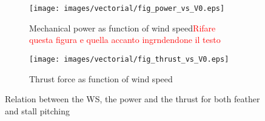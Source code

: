 \documentclass[11pt, a4paper]{article}
\begin{document}
\begin{figure}[htb]
  \centering
  \begin{subfigure}{0.49\textwidth}
  \centering
  \texttt{[image: images/vectorial/fig\_power\_vs\_V0.eps]}
  \caption{Mechanical power as function of wind speed\textcolor{red}{Rifare questa figura e quella accanto ingrndendone il testo}}
  \label{fig:fig_power_vs_V0}
  \end{subfigure}
  \begin{subfigure}{0.49\textwidth}
  \texttt{[image: images/vectorial/fig\_thrust\_vs\_V0.eps]}
  \caption{Thrust force as function of wind speed}
  \label{fig:fig_thrust_vs_V0}
  \end{subfigure}
  \caption{Relation between the WS, the power and the thrust for both feather and stall pitching}
  \label{fig:P_T_vs_V0}
\end{figure}
\end{document}
